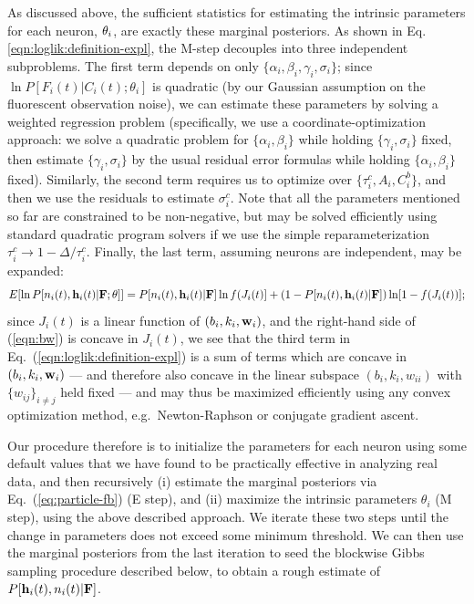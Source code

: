 As discussed above, the sufficient statistics for estimating the
intrinsic parameters for each neuron, $\mathbf{\theta}_i$, are exactly these
marginal posteriors.  As shown in
Eq. \ref{eqn:loglik:definition-expl}, the M-step decouples into three
independent subproblems.  The first term depends on only $\{\alpha_i,
\beta_i, \gamma_i, \sigma_i\}$; since $\ln P[F_i(t)|C_i(t); \theta_i]$
is quadratic (by our Gaussian assumption on the fluorescent
observation noise), we can estimate these parameters by solving a
weighted regression problem (specifically, we use a
coordinate-optimization approach: we solve a quadratic problem for
$\{\alpha_i, \beta_i\}$ while holding $\{\gamma_i, \sigma_i\}$ fixed,
then estimate $\{\gamma_i,\sigma_i\}$ by the usual residual error
formulas while holding $\{\alpha_i, \beta_i\}$ fixed).  Similarly, the
second term requires us to optimize over $\{\tau_i^c, A_i, C_i^b\}$,
and then we use the residuals to estimate $\sigma_i^c$.  Note that all
the parameters mentioned so far are constrained to be non-negative,
but may be solved efficiently using standard quadratic program solvers
if we use the simple reparameterization $\tau_i^c \to 1- \Delta /
\tau_i^c$.  Finally, the last term, assuming neurons are independent,
may be expanded:
\begin{equation} 
  E [\ln P[n_i(t), \bh_i(t) | \bF; \bth]] = P[n_i(t), \bh_i(t) |
\bF] \ln f (J_i(t)] + (1-P[n_i(t), \bh_i(t) | \bF]) \ln [1-
f(J_i(t))];
\label{eqn:bw}
\end{equation}
since $J_i(t)$ is a linear function of $(b_i,k_i,\mathbf{w}_i)$, and the
right-hand side of (\ref{eqn:bw}) is concave in $J_i(t)$, we see that
the third term in Eq.~(\ref{eqn:loglik:definition-expl}) is a sum of
terms which are concave in $(b_i,k_i,\mathbf{w}_i)$ --- and therefore also
concave in the linear subspace $(b_i,k_i, w_{ii})$ with $\{w_{ij}\}_{i
\neq j}$ held fixed --- and may thus be maximized efficiently using
any convex optimization method, e.g.\ Newton-Raphson or conjugate
gradient ascent.

Our procedure therefore is to initialize the parameters for each
neuron using some default values that we have found to be practically
effective in analyzing real data, and then recursively (i) estimate
the marginal posteriors via Eq.~(\ref{eq:particle-fb}) (E step), and
(ii) maximize the intrinsic parameters $\theta_i$ (M step), using the
above described approach.  We iterate these two steps until the change
in parameters does not exceed some minimum threshold.  We can then use
the marginal posteriors from the last iteration to seed the blockwise
Gibbs sampling procedure described below, to obtain a rough estimate
of $P[\mathbf{h}_i(t), n_i(t) | {\bf F}]$.

